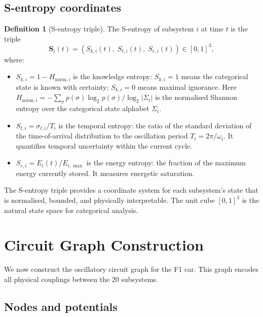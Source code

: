 \documentclass[twocolumn,10pt,a4paper]{article}
\theoremstyle{definition}
\newtheorem{definition}[theorem]{Definition}
\theoremstyle{remark}
\newcommand{\Sent}{\mathbf{S}}
\begin{document}
\subsection{S-entropy coordinates}

\begin{definition}[S-entropy triple]\label{def:s_entropy}
The S-entropy of subsystem $i$ at time $t$ is the triple
\begin{equation}\label{eq:s_entropy}
    \Sent_i(t) = (S_{k,i}(t),\; S_{t,i}(t),\; S_{e,i}(t)) \in [0,1]^3,
\end{equation}
where:
\begin{itemize}
    \item $S_{k,i} = 1 - H_{\mathrm{norm},i}$ is the knowledge entropy: $S_{k,i} = 1$ means the categorical state is known with certainty; $S_{k,i} = 0$ means maximal ignorance. Here $H_{\mathrm{norm},i} = -\sum_\sigma p(\sigma) \log_2 p(\sigma) / \log_2 |\Sigma_i|$ is the normalised Shannon entropy over the categorical state alphabet $\Sigma_i$.
    \item $S_{t,i} = \sigma_{t,i} / T_i$ is the temporal entropy: the ratio of the standard deviation of the time-of-arrival distribution to the oscillation period $T_i = 2\pi/\omega_i$. It quantifies temporal uncertainty within the current cycle.
    \item $S_{e,i} = E_i(t) / E_{i,\max}$ is the energy entropy: the fraction of the maximum energy currently stored. It measures energetic saturation.
\end{itemize}
\end{definition}

The S-entropy triple provides a coordinate system for each subsystem's state that is normalised, bounded, and physically interpretable. The unit cube $[0,1]^3$ is the natural state space for categorical analysis.


\section{Circuit Graph Construction}\label{sec:circuit_graph}

We now construct the oscillatory circuit graph for the F1 car. This graph encodes all physical couplings between the 20 subsystems.

\subsection{Nodes and potentials}
\end{document}
